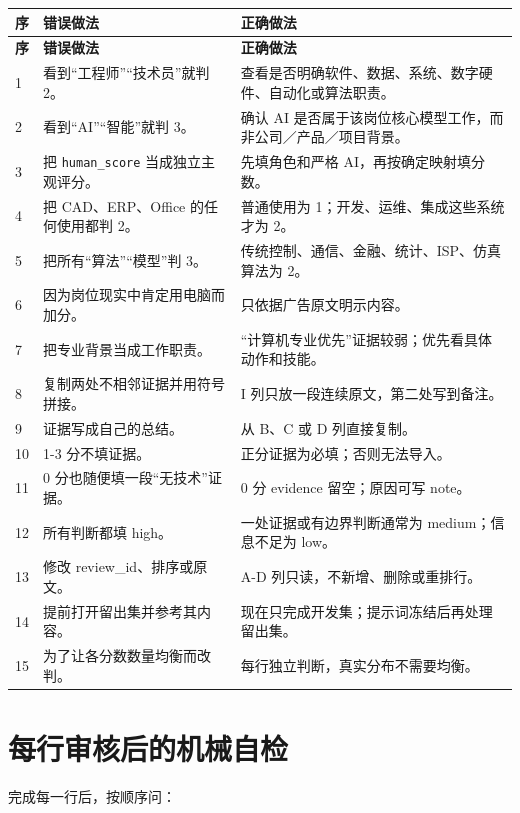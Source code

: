 \documentclass[11pt,a4paper,fontset=none]{ctexart}
\newcommand{\field}[1]{\nolinkurl{#1}}
\begin{document}
\begin{longtable}{C{0.8cm}L{6.0cm}L{7.2cm}}
\toprule
{}\color{white}\textbf{序} & \color{white}\textbf{错误做法} & \color{white}\textbf{正确做法}\\
\midrule
\endfirsthead
\toprule
{}\color{white}\textbf{序} & \color{white}\textbf{错误做法} & \color{white}\textbf{正确做法}\\
\midrule
{} & 看到“工程师”“技术员”就判 2。 & 查看是否明确软件、数据、系统、数字硬件、自动化或算法职责。\\
2 & 看到“AI”“智能”就判 3。 & 确认 AI 是否属于该岗位核心模型工作，而非公司／产品／项目背景。\\
3 & 把 \field{human_score} 当成独立主观评分。 & 先填角色和严格 AI，再按确定映射填分数。\\
4 & 把 CAD、ERP、Office 的任何使用都判 2。 & 普通使用为 1；开发、运维、集成这些系统才为 2。\\
5 & 把所有“算法”“模型”判 3。 & 传统控制、通信、金融、统计、ISP、仿真算法为 2。\\
6 & 因为岗位现实中肯定用电脑而加分。 & 只依据广告原文明示内容。\\
7 & 把专业背景当成工作职责。 & “计算机专业优先”证据较弱；优先看具体动作和技能。\\
8 & 复制两处不相邻证据并用符号拼接。 & I 列只放一段连续原文，第二处写到备注。\\
9 & 证据写成自己的总结。 & 从 B、C 或 D 列直接复制。\\
10 & 1-3 分不填证据。 & 正分证据为必填；否则无法导入。\\
11 & 0 分也随便填一段“无技术”证据。 & 0 分 evidence 留空；原因可写 note。\\
12 & 所有判断都填 high。 & 一处证据或有边界判断通常为 medium；信息不足为 low。\\
13 & 修改 review\_id、排序或原文。 & A-D 列只读，不新增、删除或重排行。\\
14 & 提前打开留出集并参考其内容。 & 现在只完成开发集；提示词冻结后再处理留出集。\\
15 & 为了让各分数数量均衡而改判。 & 每行独立判断，真实分布不需要均衡。\\
\bottomrule
\end{longtable}

\section{每行审核后的机械自检}

完成每一行后，按顺序问：
\end{document}
